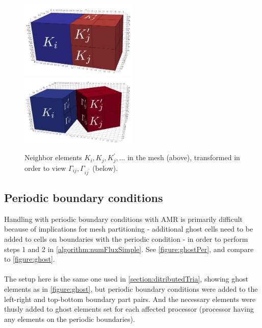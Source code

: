 \begin{figure}[H]
		\begin{center}
			\includegraphics[width=0.5\textwidth]{img/mesh/neighborsOneLargerK.jpg}
			\vspace{3mm}
			\includegraphics[width=0.5\textwidth]{img/mesh/neighborsOneLargerSepK.jpg}
			\vspace{-5mm}
		\caption{Neighbor elements $K_i, K_j, K_j^{'}, ...$ in the mesh (above), transformed in order to view $\Gamma_{ij}, \Gamma_{i{j^{'}}}$ (below).}
		\label{figure:worseNeighbors}
		\end{center}
	\end{figure}\vspace{-5mm}

\subsection{Periodic boundary conditions}
\label{amrPer}
Handling with periodic boundary conditions with AMR is primarily difficult because of implications for mesh partitioning - additional ghost cells need to be added to cells on boundaries with the periodic condition - in order to perform steps 1 and 2 in \cref{algorithm:numFluxSimple}. See \cref{figure:ghostPer}, and compare to \cref{figure:ghost}.

\paragraph{}
The setup here is the same one used in \cref{section:ditributedTria}, showing ghost elements as in \cref{figure:ghost}, but periodic boundary conditions were added to the left-right and top-bottom boundary part pairs. And the necessary elements were thusly added to ghost elements set for each affected processor (processor having any elements on the periodic boundaries).

